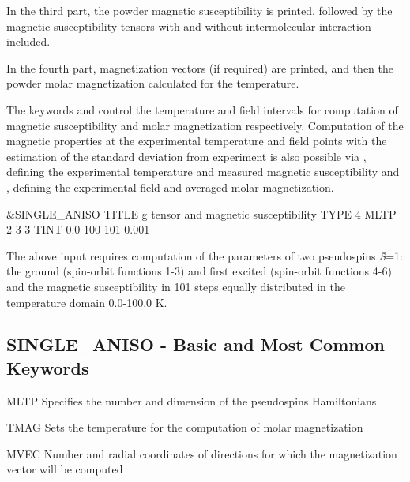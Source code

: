 In the third part, the powder magnetic susceptibility is printed, followed by the magnetic susceptibility tensors with and without intermolecular interaction included.

In the fourth part, magnetization vectors (if required) are printed, and then the powder molar magnetization calculated for the  
temperature.

The keywords  and  control the temperature and field intervals for computation of 
magnetic susceptibility and molar magnetization respectively. 
Computation of the magnetic properties at the experimental temperature and field points with the estimation of the standard deviation from experiment
is also possible via , defining the experimental temperature and measured magnetic susceptibility and 
, defining the experimental field and averaged molar magnetization.

\begin{inputlisting}
 &SINGLE_ANISO
 TITLE
 g tensor and magnetic susceptibility
 TYPE
 4
 MLTP
 2
 3 3
 TINT
 0.0 100 101 0.001
\end{inputlisting}

The above input requires computation of the parameters of two pseudospins \textit{\~{S}}=1: the ground (spin-orbit functions 1-3) 
and first excited (spin-orbit functions 4-6) and the magnetic susceptibility in 101 steps equally distributed in 
the temperature domain 0.0-100.0 K.

\subsection{SINGLE\_ANISO - Basic and Most Common Keywords}
\begin{keywordlist}
\item[MLTP] Specifies the number and dimension of the pseudospins Hamiltonians
\item[TMAG] Sets the temperature for the computation of molar magnetization
\item[MVEC] Number and radial coordinates of directions for which the magnetization vector will be computed
\end{keywordlist}

